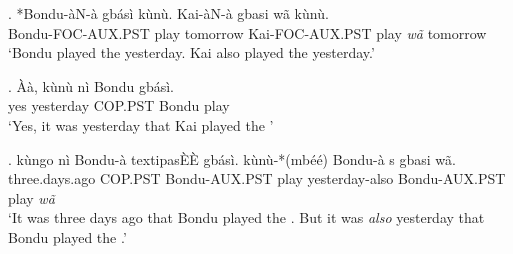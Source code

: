 \documentclass{assets/fieldnotes}
\begin{document}
\exg. *Bondu-àN-à  gbásì kùnù. Kai-àN-à  gbasi wã kùnù.\\
Bondu-FOC-AUX.PST  play tomorrow Kai-FOC-AUX.PST  play \textit{wã} tomorrow\\
`Bondu played the  yesterday. Kai also played the  yesterday.'

\exg. Àà, kùnù nì Bondu  gbásì.\\
yes yesterday COP.PST Bondu  play\\
`Yes, it was yesterday that Kai played the '

\exg. kùngo nì Bondu-à textipa{s\`E\`E} gbásì. kùnù-*(mbéé) Bondu-à s gbasi wã.\\
three.days.ago COP.PST Bondu-AUX.PST  play yesterday-also Bondu-AUX.PST  play \textit{wã}\\
`It was three days ago that Bondu played the . But it was \textit{also} yesterday that Bondu played the .'
\end{document}
